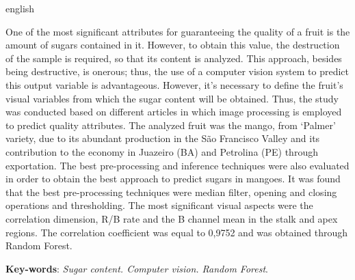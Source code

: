 \begin{resumo}[Abstract]
\begin{otherlanguage*}{english}

One of the most significant attributes for guaranteeing the quality of a fruit is the amount of sugars contained in it. However, to obtain this value, the destruction 
of the sample is required, so that its content is analyzed. This approach, besides being destructive, is onerous; thus, the use of a computer vision system to predict 
this output variable is advantageous. However, it’s necessary to define the fruit’s visual variables from which the sugar content will be obtained. Thus, the study 
was conducted based on different articles in which image processing is employed to predict quality attributes. The analyzed fruit was the mango, from ‘Palmer’
 variety, due to its abundant production in the São Francisco Valley and its contribution to the economy in Juazeiro (BA) and Petrolina (PE) through exportation. 
 The best pre-processing and inference techniques were also evaluated in order to obtain the best approach to predict sugars in mangoes. It was found that the best pre-processing techniques were median filter, opening and closing operations and thresholding. The most significant visual aspects were the correlation dimension, R/B rate and the B channel mean in the stalk and apex regions. The correlation coefficient was equal to 0,9752 and was obtained through Random Forest.

	\vspace{\onelineskip}

	\noindent
	\textbf{Key-words}: \textit{Sugar content. Computer vision. Random Forest}.

\end{otherlanguage*}
\end{resumo}



